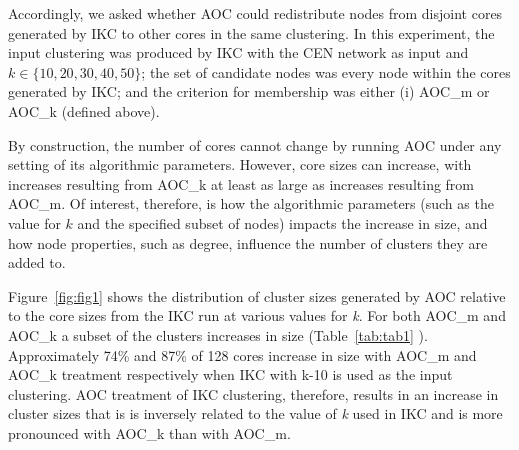 \documentclass[12pt, oneside]{article}   	%
\begin{document}
Accordingly, we asked whether AOC could redistribute nodes from disjoint cores generated by IKC to other cores in the same clustering. 
In this experiment, the input clustering was produced by IKC with the CEN network as input and $k \in \{10, 20, 30, 40, 50\}$; the set of candidate nodes was every node within the cores generated by IKC; and the criterion for membership was either (i) AOC\_m or AOC\_k (defined above).


By construction, the number of cores cannot change by running AOC  under any setting of its algorithmic parameters. However, core sizes can increase, with increases resulting from AOC\_k at least as large as increases resulting from AOC\_m.
Of interest, therefore, is how the algorithmic parameters (such as the value for $k$ and the specified subset of nodes) impacts the increase in size, and how node properties, such as degree, influence the number of clusters they are added to.

Figure~\ref{fig:fig1} shows the distribution of cluster sizes generated by AOC relative to the core sizes from the IKC run at various values for \emph{k}. For both AOC\_m and AOC\_k a subset of the clusters increases in size (Table~\ref{tab:tab1} ).
Approximately 74\% and 87\% of  128 cores increase in size with AOC\_m and AOC\_k treatment respectively when IKC with k-10 is used as the input clustering. AOC treatment of IKC clustering, therefore, results in an increase in cluster sizes that is is inversely related to the value of \emph{k} used in IKC and is more pronounced with AOC\_k than with AOC\_m. 
\end{document}
